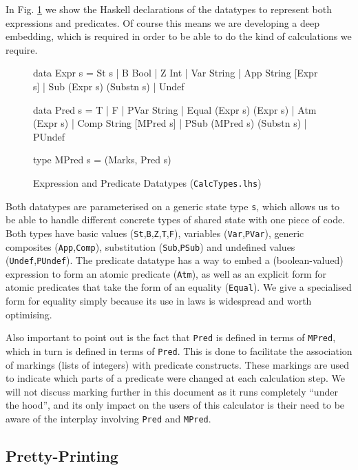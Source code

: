 In Fig. \ref{fig:expr-pred-types} we show the Haskell declarations
of the datatypes to represent both expressions and predicates.
Of course this means we are developing a deep embedding\cite{Gibbons:2014:FDS},
which is required in order to be able to do the kind of calculations we require.
\begin{figure}[tb]
\begin{code}
data Expr s
  = St s | B Bool | Z Int | Var String
  | App String [Expr s] | Sub (Expr s) (Substn s) | Undef

data Pred s
  = T | F | PVar String | Equal (Expr s) (Expr s) | Atm (Expr s)
  | Comp String [MPred s] | PSub (MPred s) (Substn s) | PUndef

type MPred s = (Marks, Pred s)
\end{code}
  \caption{Expression and Predicate Datatypes (\texttt{CalcTypes.lhs})}
  \label{fig:expr-pred-types}
\end{figure}
Both datatypes are parameterised on a generic state type \texttt{s},
which allows us to be able to handle different concrete types
of shared state with one piece of code.
Both types have basic values (\texttt{St},\texttt{B},\texttt{Z},\texttt{T},\texttt{F}),
variables (\texttt{Var},\texttt{PVar}),
generic composites (\texttt{App},\texttt{Comp}),
substitution (\texttt{Sub},\texttt{PSub})
and undefined values (\texttt{Undef},\texttt{PUndef}).
The predicate datatype has a way to embed a (boolean-valued)
expression to form an atomic predicate (\texttt{Atm}),
as well as an explicit form for atomic predicates that take
the form of an equality (\texttt{Equal}).
We give a specialised form for equality simply because
its use in laws is widespread and worth optimising.

Also important to point out is the fact that \texttt{Pred} is
defined in terms of \texttt{MPred}, which in turn is defined
in terms of \texttt{Pred}.
This is done to facilitate the association of markings (lists of integers)
with predicate constructs.
These markings are used to indicate which parts of a predicate
were changed at each calculation step.
We will not discuss marking further in this document
as it runs completely ``under the hood'',
and its only impact on the users of this calculator
is their need to be aware of the interplay involving \texttt{Pred} and \texttt{MPred}.


\subsection{Pretty-Printing}\label{ssec:pp}

